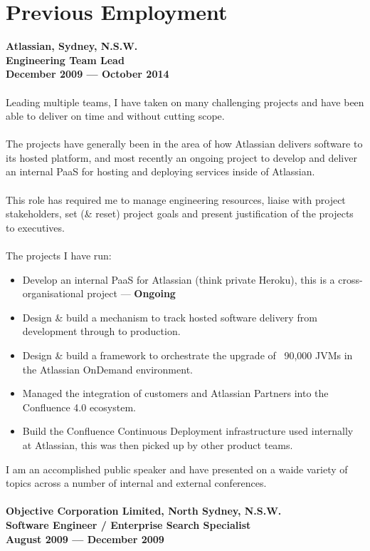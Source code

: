 \documentclass[a4paper]{article}
\begin{document}
\section*{Previous Employment}
\textbf{Atlassian, Sydney, N.S.W.\\Engineering Team Lead\\December 2009 --- October 2014}\\\\
Leading multiple teams, I have taken on many challenging projects and have been able to deliver on time and without cutting scope.
\\\\The projects have generally been in the area of how Atlassian delivers software to its hosted platform, and most recently an ongoing project to develop and deliver an internal PaaS for hosting and deploying services inside of Atlassian.
\\\\
This role has required me to manage engineering resources, liaise with project stakeholders, set (\& reset) project goals and present justification of the projects to executives.
\\\\
The projects I have run:
\begin{itemize}
\item Develop an internal PaaS for Atlassian (think private Heroku), this is a cross-organisational project --- \textbf{Ongoing}
\item Design \& build a mechanism to track hosted software delivery from development through to production.
\item Design \& build a framework to orchestrate the upgrade of ~90,000 JVMs in the Atlassian OnDemand environment.
\item Managed the integration of customers and Atlassian Partners into the Confluence 4.0 ecosystem.
\item Build the Confluence Continuous Deployment infrastructure used internally at Atlassian, this was then picked up by other product teams.
\end{itemize}
I am an accomplished public speaker and have presented on a waide variety of topics across a number of internal and external conferences.
\\\\
\textbf{Objective Corporation Limited, North Sydney, N.S.W.\\Software Engineer / Enterprise Search Specialist\\August 2009 --- December 2009}\\\\
\end{document}
